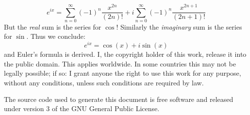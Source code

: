 \documentclass{article}
\begin{document}
    \begin{equation}
        e^{ix}=\sum_{n=0}^{\infty}(-1)^{n}\frac{x^{2n}}{(2n)!}
            +i\sum_{n=0}^{\infty}(-1)^{n}\frac{x^{2n+1}}{(2n+1)!}
    \end{equation}
    But the \textit{real} sum is the series for $\cos$! Similarly the
    \textit{imaginary} sum is the series for $\sin$. Thus we conclude:
    \begin{equation}
        e^{ix}=\cos(x)+i\sin(x)
    \end{equation}
    and Euler's formula is derived.
    \newpage
    I, the copyright holder of this work, release it into the public domain.
    This applies worldwide. In some countries this may not be legally possible;
    if so: I grant anyone the right to use this work for any purpose, without
    any conditions, unless such conditions are required by law.
    \par\hfill\par
    The source code used to generate this document is free software and released
    under version 3 of the GNU General Public License.
\end{document}
